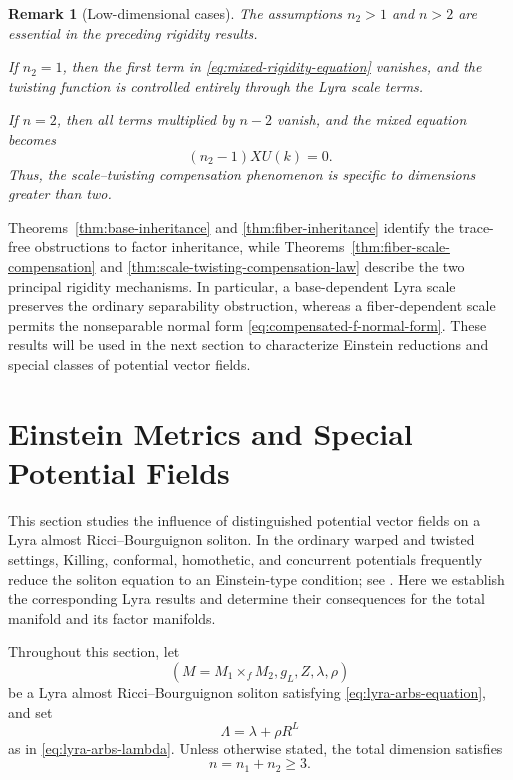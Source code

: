 \documentclass[a4paper,11pt]{article}
\theoremstyle{plain}
\newtheorem{remark}{Remark}[section]
\numberwithin{equation}{section}
\begin{document}
\begin{remark}[Low-dimensional cases]
	\label{rem:low-dimensional-mixed-rigidity}
	The assumptions \(n_{2}>1\) and \(n>2\) are essential in the
	preceding rigidity results.
	
	If \(n_{2}=1\), then the first term in
	\eqref{eq:mixed-rigidity-equation} vanishes, and the twisting
	function is controlled entirely through the Lyra scale terms.
	
	If \(n=2\), then all terms multiplied by \(n-2\) vanish, and
	the mixed equation becomes
	\[
	(n_{2}-1)XU(k)=0.
	\]
	Thus, the scale--twisting compensation phenomenon is specific
	to dimensions greater than two.
\end{remark}

Theorems~\ref{thm:base-inheritance} and
\ref{thm:fiber-inheritance} identify the trace-free obstructions
to factor inheritance, while
Theorems~\ref{thm:fiber-scale-compensation} and
\ref{thm:scale-twisting-compensation-law} describe the two
principal rigidity mechanisms. In particular, a base-dependent
Lyra scale preserves the ordinary separability obstruction,
whereas a fiber-dependent scale permits the nonseparable normal
form \eqref{eq:compensated-f-normal-form}. These results will be
used in the next section to characterize Einstein reductions and
special classes of potential vector fields.


\section{Einstein Metrics and Special Potential Fields}
\label{sec:einstein-special-fields}

This section studies the influence of distinguished potential vector
fields on a Lyra almost Ricci--Bourguignon soliton. In the ordinary
warped and twisted settings, Killing, conformal, homothetic, and
concurrent potentials frequently reduce the soliton equation to an
Einstein-type condition; see
\cite{BinTurkiEtAl2022,ShenawyEtAl2023,
	ElsharkawyTawfiq2026}. Here we establish the corresponding Lyra
results and determine their consequences for the total manifold and
its factor manifolds.

Throughout this section, let
\[
\left(
M=M_{1}\times_{f}M_{2},
g_{L},
Z,
\lambda,
\rho
\right)
\]
be a Lyra almost Ricci--Bourguignon soliton satisfying
\eqref{eq:lyra-arbs-equation}, and set
\[
\Lambda=\lambda+\rho R^{L}
\]
as in \eqref{eq:lyra-arbs-lambda}. Unless otherwise stated, the
total dimension satisfies
\[
n=n_{1}+n_{2}\geq 3.
\]
\end{document}
